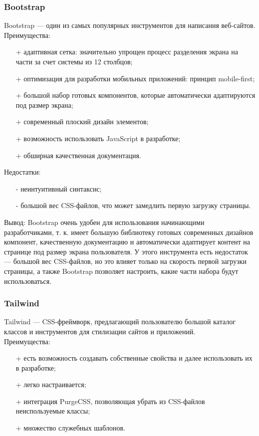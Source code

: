 \documentclass[a4paper,12pt]{article}
\begin{document}
\subsubsection{Bootstrap}
Bootstrap — один из самых популярных инструментов для написания веб-сайтов.\\
Преимущества:
\begin{itemize}
	\item[+] адаптивная сетка: значительно упрощен процесс разделения экрана на части за счет системы из 12 столбцов;
	\item[+] оптимизация для разработки мобильных приложений: принцип mobile-first;
	\item[+] большой набор готовых компонентов, которые автоматически адаптируются под размер экрана;
	\item[+] современный плоский дизайн элементов;
	\item[+] возможность использовать JavaScript в разработке;
	\item[+] обширная качественная документация.
\end{itemize}

Недостатки:
\begin{itemize}
	\item[-] неинтуитивный синтаксис;
	\item[-] большой вес CSS-файлов, что может замедлить первую загрузку страницы.\\
\end{itemize}

Вывод: Bootstrap очень удобен для использования начинающими разработчиками, т. к. имеет большую библиотеку готовых современных дизайнов компонент, качественную документацию и автоматически адаптирует контент на странице под размер экрана пользователя. У этого инструмента есть недостаток — большой вес CSS-файлов, но это влияет только на скорость первой загрузки страницы, а также Bootstrap позволяет настроить, какие части набора будут использоваться.\\

\subsubsection{Tailwind}
Tailwind — CSS-фреймворк, предлагающий пользователю большой каталог классов и инструментов для стилизации сайтов и приложений.\\
Преимущества:
\begin{itemize}
	\item[+] есть возможность создавать собственные свойства и далее использовать их в разработке;
	\item[+] легко настраивается;
	\item[+] интеграция PurgeCSS, позволяющая убрать из CSS-файлов неиспользуемые классы;
	\item[+] множество служебных шаблонов.
\end{itemize}
\end{document}
